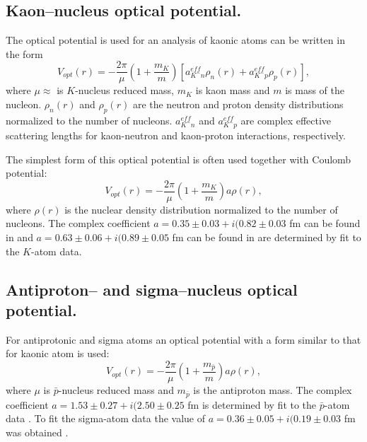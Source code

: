 \subsection{Kaon--nucleus optical potential.}
\hspace{1.0em}
The optical potential is used for an analysis of kaonic atoms can be written in
the form
\begin{equation}
\label{PP17} V_{opt}(r)=-\frac{2\pi}{\mu}(1+\frac{m_{K}}{m})[
a^{eff}_{K^{-}n}\rho_{n}(r)+a^{eff}_{K^{-}p}\rho_{p}(r)],
\end{equation}
where $\mu\approx$ is $K$-nucleus reduced mass, $m_{K}$ is kaon mass and 
 $m$ is mass of the nucleon. $\rho_{n}(r)$ and $\rho_{p}(r)$ are the neutron
 and proton density distributions 
  normalized to the 
number of nucleons. $a^{eff}_{K^{-}n}$ and $a^{eff}_{K^{-}p}$ are complex 
effective scattering lengths for kaon-neutron and kaon-proton interactions, 
respectively.

The simplest form of this optical potential is often used together with Coulomb
 potential:
\begin{equation}
\label{PP18} V_{opt}(r)=-\frac{2\pi}{\mu}(1+\frac{m_{K}}{m})a\rho(r),
\end{equation} 
where $\rho(r)$ is the nuclear density distribution normalized to the 
number of nucleons. The complex coefficient $a=0.35 \pm 0.03 + 
i(0.82 \pm 0.03$ fm can be found in  \cite{Batty82} and $a=0.63 \pm 0.06 + 
i(0.89 \pm 0.05$ fm can be found in \cite{Batty95} are determined 
by fit to the $K$-atom data.

\subsection{ Antiproton-- and sigma--nucleus optical potential.}
\hspace{1.0em}
 For antiprotonic and sigma atoms an optical potential with a form similar to that for 
 kaonic atom is used:
\begin{equation}
\label{PP19} V_{opt}(r)=-\frac{2\pi}{\mu}(1+\frac{m_{{\bar{p}}}}{m})a\rho(r),
\end{equation} 
where $\mu$ is $\bar{p}$-nucleus reduced mass and 
$m_{\bar{p}}$ is the antiproton mass. The complex coefficient $a=1.53 \pm 0.27
 + 
i(2.50 \pm 0.25$ fm  is determined 
by fit to the $\bar{p}$-atom data \cite{Batty82}. To fit the sigma-atom data 
the value of $a=0.36 \pm 0.05
 + 
i(0.19 \pm 0.03$ fm was obtained \cite{Batty82}.

